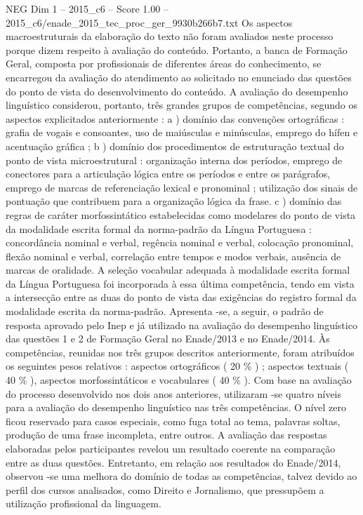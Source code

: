 \begin{textsample}{NEG Dim 1 – 2015\_c6 – Score 1.00 – 2015\_c6/enade\_2015\_tec\_proc\_ger\_9930b266b7.txt}
Os aspectos macroestruturais da elaboração do texto não foram avaliados neste processo porque dizem respeito à avaliação do conteúdo.
Portanto, a banca de Formação Geral, composta por profissionais de diferentes áreas do conhecimento, se encarregou da avaliação do atendimento ao solicitado no enunciado das questões do ponto de vista do desenvolvimento do conteúdo.
A avaliação do desempenho linguístico considerou, portanto, três grandes grupos de competências, segundo os aspectos explicitados anteriormente : a ) domínio das convenções ortográficas : grafia de vogais e consoantes, uso de maiúsculas e minúsculas, emprego do hífen e acentuação gráfica ; b ) domínio dos procedimentos de estruturação textual do ponto de vista microestrutural : organização interna dos períodos, emprego de conectores para a articulação lógica entre os períodos e entre os parágrafos, emprego de marcas de referenciação lexical e pronominal ; utilização dos sinais de pontuação que contribuem para a organização lógica da frase. c ) domínio das regras de caráter morfossintático estabelecidas como modelares do ponto de vista da modalidade escrita formal da norma-padrão da Língua Portuguesa : concordância nominal e verbal, regência nominal e verbal, colocação pronominal, flexão nominal e verbal, correlação entre tempos e modos verbais, ausência de marcas de oralidade.
A seleção vocabular adequada à modalidade escrita formal da Língua Portuguesa foi incorporada à essa última competência, tendo em vista a intersecção entre as duas do ponto de vista das exigências do registro formal da modalidade escrita da norma-padrão.
Apresenta -se, a seguir, o padrão de resposta aprovado pelo Inep e já utilizado na avaliação do desempenho linguístico das questões 1 e 2 de Formação Geral no Enade/2013 e no Enade/2014.
Às competências, reunidas nos três grupos descritos anteriormente, foram atribuídos os seguintes pesos relativos : aspectos ortográficos ( 20 \% ) ; aspectos textuais ( 40 \% ), aspectos morfossintáticos e vocabulares ( 40 \% ).
Com base na avaliação do processo desenvolvido nos dois anos anteriores, utilizaram -se quatro níveis para a avaliação do desempenho linguístico nas três competências.
O nível zero ficou reservado para casos especiais, como fuga total ao tema, palavras soltas, produção de uma frase incompleta, entre outros.
A avaliação das respostas elaboradas pelos participantes revelou um resultado coerente na comparação entre as duas questões.
Entretanto, em relação aos resultados do Enade/2014, observou -se uma melhora do domínio de todas as competências, talvez devido ao perfil dos cursos analisados, como Direito e Jornalismo, que pressupõem a utilização profissional da linguagem.

\end{textsample}
